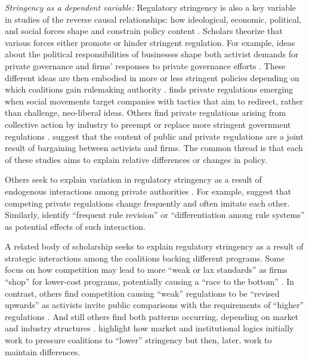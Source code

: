 \documentclass[
      12pt,
            Review ]{article}
\begin{document}
\emph{Stringency as a dependent variable:} Regulatory stringency is also
a key variable in studies of the reverse causal relationships: how
ideological, economic, political, and social forces shape and constrain
policy content \citep{Bartley2003, Cashore2004, Fischer2014}. Scholars
theorize that various forces either promote or hinder stringent
regulation. For example, ideas about the political responsibilities of
businesses shape both activist demands for private governance and firms'
responses to private governance efforts \citep{Bartley2003, Djelic2017}.
These different ideas are then embodied in more or less stringent
policies depending on which coalitions gain rulemaking authority
\citep{Botzem2012, Hsueh2012}. \citet{Bartley2003} finds private
regulations emerging when social movements target companies with tactics
that aim to redirect, rather than challenge, neo-liberal ideas. Others
find private regulations arising from collective action by industry to
preempt or replace more stringent government regulations
\citep{Bartley2007, Cashore2002, Grabosky2013, Green2013, Loconto2014, Lyon2008, Maxwell2000, Prakash2000}.
\citet{Abbott2009} suggest that the content of public and private
regulations are a joint result of bargaining between activists and
firms. The common thread is that each of these studies aims to explain
relative differences or changes in policy.

Others seek to explain variation in regulatory stringency as a result of
endogenous interactions among private authorities
\citep{DeLeon2009, Eberlein2014, Green2017, Gulbrandsen2014, Howard-Grenville2008, Li2015, Mills2016d}.
For example, \citet{Smith2010} suggest that competing private
regulations change frequently and often imitate each other. Similarly,
\citet{Eberlein2014} identify ``frequent rule revision'' or
``differentiation among rule systems'' as potential effects of such
interaction.

A related body of scholarship seeks to explain regulatory stringency as
a result of strategic interactions among the coalitions backing
different programs. Some focus on how competition may lead to more
``weak or lax standards'' as firms ``shop'' for lower-cost programs,
potentially causing a ``race to the bottom''
\citep{Abbott2010, Fransen2011, Gulbrandsen2004}. In contrast, others
find competition causing ``weak'' regulations to be ``revised upwards''
as activists invite public comparisons with the requirements of
``higher'' regulations \citep{Overdevest2005, Overdevest2010}. And still
others find both patterns occurring, depending on market and industry
structures \citep{Cashore2004, Hassel2008, VanderVen2015}.
\citet{Cashore2004} highlight how market and institutional logics
initially work to pressure coalitions to ``lower'' stringency but then,
later, work to maintain differences.
\end{document}
